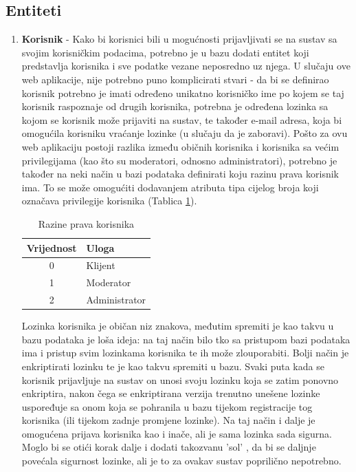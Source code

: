 \documentclass[times, utf8, zavrsni]{fer}
\begin{document}
\subsection{Entiteti}
\begin{enumerate}[leftmargin=*]
\item \textbf{Korisnik} -
Kako bi korisnici bili u mogućnosti prijavljivati se na sustav sa svojim korisničkim podacima, potrebno je u bazu dodati entitet koji predstavlja korisnika i sve podatke vezane neposredno uz njega. U slučaju ove web aplikacije, nije potrebno puno komplicirati stvari - da bi se definirao korisnik potrebno je imati određeno unikatno korisničko ime po kojem se taj korisnik raspoznaje od drugih korisnika, potrebna je određena lozinka sa kojom se korisnik može prijaviti na sustav, te također e-mail adresa, koja bi omogućila korisniku vraćanje lozinke (u slučaju da je zaboravi). Pošto za ovu web aplikaciju postoji razlika između običnih korisnika i korisnika sa većim privilegijama (kao što su moderatori, odnosno administratori), potrebno je također na neki način u bazi podataka definirati koju razinu prava korisnik ima. To se može omogućiti dodavanjem atributa tipa cijelog broja koji označava privilegije korisnika (Tablica \ref{tbl:razine-prava}).

\begin{table}[H]
\caption{Razine prava korisnika}
\label{tbl:razine-prava}
\centering
\begin{tabular}{cl}
\hline
Vrijednost & Uloga\\
\hline
0 & Klijent \\
1 & Moderator \\
2 & Administrator \\ 
\hline
\end{tabular}
\end{table}

Lozinka korisnika je običan niz znakova, međutim spremiti je kao takvu u bazu podataka je loša ideja: na taj način bilo tko sa pristupom bazi podataka ima i pristup svim lozinkama korisnika te ih može zlouporabiti. Bolji način je enkriptirati lozinku te je kao takvu spremiti u bazu. Svaki puta kada se korisnik prijavljuje na sustav on unosi svoju lozinku koja se zatim ponovno enkriptira, nakon čega se enkriptirana verzija trenutno unešene lozinke uspoređuje sa onom koja se pohranila u bazu tijekom registracije tog korisnika (ili tijekom zadnje promjene lozinke). Na taj način i dalje je omogućena prijava korisnika kao i inače, ali je sama lozinka sada sigurna. Moglo bi se otići korak dalje i dodati takozvanu 'sol' , da bi se daljnje povećala sigurnost lozinke, ali je to za ovakav sustav poprilično nepotrebno.\clearpage


\end{enumerate}
\end{document}
